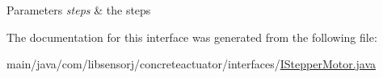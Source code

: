 \begin{DoxyParams}{Parameters}
{\em steps} & the steps \\
\hline
\end{DoxyParams}


The documentation for this interface was generated from the following file\+:\begin{DoxyCompactItemize}
\item 
main/java/com/libsensorj/concreteactuator/interfaces/\hyperlink{IStepperMotor_8java}{I\+Stepper\+Motor.\+java}\end{DoxyCompactItemize}
